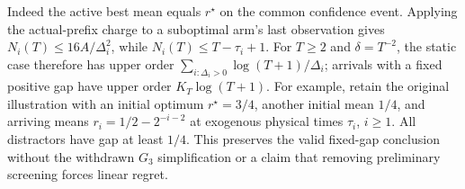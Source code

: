 Indeed the active best mean equals $r^\star$ on the common confidence
event. Applying the actual-prefix charge to a suboptimal arm's last
observation gives $N_i(T)\le16A/\Delta_i^2$, while
$N_i(T)\le T-\tau_i+1$. For $T\ge2$ and $\delta=T^{-2}$, the static case therefore
has upper order $\sum_{i:\Delta_i>0}\log(T+1)/\Delta_i$; arrivals with
a fixed positive gap have upper order $K_T\log(T+1)$.
For example, retain the original illustration with an initial optimum
$r^\star=3/4$, another initial mean $1/4$, and arriving means
$r_i=1/2-2^{-i-2}$ at exogenous physical times $\tau_i$, $i\ge1$.
All distractors have gap at least $1/4$. This preserves the valid
fixed-gap conclusion without the withdrawn $G_3$ simplification or a
claim that removing preliminary screening forces linear regret.

